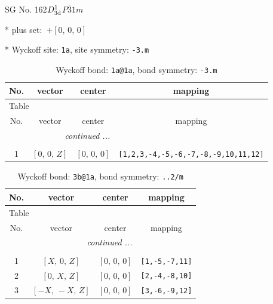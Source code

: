 \documentclass[fleqn,8pt]{jsarticle}
\begin{document}
\setcounter{MaxMatrixCols}{32}

\renewcommand{\tablename}{Table~}
\renewcommand{\figurename}{Figure~}
\begin{center}
\LARGE
SG No. 162\quad$D_{\rm 3d}^{1}$\quad$P\bar{3}1m$\quad[ trigonal ]
\end{center}

* plus set:\,\,\,$+\left[ 0,\, 0,\, 0 \right]$


* Wyckoff site: {\tt 1a}, site symmetry: {\tt -3.m}
\renewcommand{\arraystretch}{1.2}
\begin{longtable}{cccc}
\caption{Wyckoff bond: {\tt 1a@1a}, bond symmetry: {\tt -3.m}}
 \\
 \hline \hline
No. & vector & center & mapping \\ \hline \endfirsthead

\multicolumn{3}{l}{\tablename\ \thetable{}} \\
 \hline \hline
No. & vector & center & mapping \\ \hline \endhead

 \hline \hline
\multicolumn{3}{r}{\footnotesize\it continued ...} \\ \endfoot

 \hline \hline
\multicolumn{3}{r}{} \\ \endlastfoot

1 & $\left[ 0,\, 0,\, Z \right]$ & $\left[ 0,\, 0,\, 0 \right]$ & {\tt [1,2,3,-4,-5,-6,-7,-8,-9,10,11,12]} \\
\end{longtable}
\renewcommand{\arraystretch}{1.2}
\begin{longtable}{cccc}
\caption{Wyckoff bond: {\tt 3b@1a}, bond symmetry: {\tt ..2/m}}
 \\
 \hline \hline
No. & vector & center & mapping \\ \hline \endfirsthead

\multicolumn{3}{l}{\tablename\ \thetable{}} \\
 \hline \hline
No. & vector & center & mapping \\ \hline \endhead

 \hline \hline
\multicolumn{3}{r}{\footnotesize\it continued ...} \\ \endfoot

 \hline \hline
\multicolumn{3}{r}{} \\ \endlastfoot

1 & $\left[ X,\, 0,\, Z \right]$ & $\left[ 0,\, 0,\, 0 \right]$ & {\tt [1,-5,-7,11]} \\ \hline
2 & $\left[ 0,\, X,\, Z \right]$ & $\left[ 0,\, 0,\, 0 \right]$ & {\tt [2,-4,-8,10]} \\ \hline
3 & $\left[ - X,\, - X,\, Z \right]$ & $\left[ 0,\, 0,\, 0 \right]$ & {\tt [3,-6,-9,12]} \\
\end{longtable}
\end{document}

